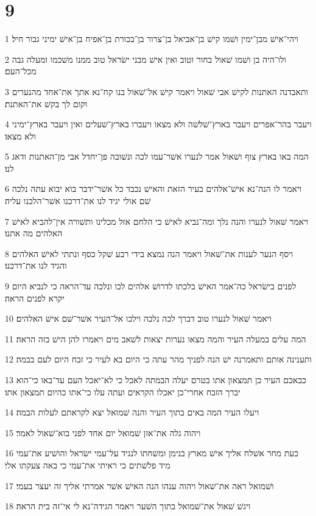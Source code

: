 \chapter{9}

\par 1 ויהי־אישׁ מבן־ימין ושׁמו קישׁ בן־אביאל בן־צרור בן־בכורת בן־אפיח בן־אישׁ ימיני גבור חיל׃
\par 2 ולו־היה בן ושׁמו שׁאול בחור וטוב ואין אישׁ מבני ישׂראל טוב ממנו משׁכמו ומעלה גבה מכל־העם׃
\par 3 ותאבדנה האתנות לקישׁ אבי שׁאול ויאמר קישׁ אל־שׁאול בנו קח־נא אתך את־אחד מהנערים וקום לך בקשׁ את־האתנת׃
\par 4 ויעבר בהר־אפרים ויעבר בארץ־שׁלשׁה ולא מצאו ויעברו בארץ־שׁעלים ואין ויעבר בארץ־ימיני ולא מצאו׃
\par 5 המה באו בארץ צוף ושׁאול אמר לנערו אשׁר־עמו לכה ונשׁובה פן־יחדל אבי מן־האתנות ודאג לנו׃
\par 6 ויאמר לו הנה־נא אישׁ־אלהים בעיר הזאת והאישׁ נכבד כל אשׁר־ידבר בוא יבוא עתה נלכה שׁם אולי יגיד לנו את־דרכנו אשׁר־הלכנו עליה׃
\par 7 ויאמר שׁאול לנערו והנה נלך ומה־נביא לאישׁ כי הלחם אזל מכלינו ותשׁורה אין־להביא לאישׁ האלהים מה אתנו׃
\par 8 ויסף הנער לענות את־שׁאול ויאמר הנה נמצא בידי רבע שׁקל כסף ונתתי לאישׁ האלהים והגיד לנו את־דרכנו׃
\par 9 לפנים בישׂראל כה־אמר האישׁ בלכתו לדרושׁ אלהים לכו ונלכה עד־הראה כי לנביא היום יקרא לפנים הראה׃
\par 10 ויאמר שׁאול לנערו טוב דברך לכה נלכה וילכו אל־העיר אשׁר־שׁם אישׁ האלהים׃
\par 11 המה עלים במעלה העיר והמה מצאו נערות יצאות לשׁאב מים ויאמרו להן הישׁ בזה הראה׃
\par 12 ותענינה אותם ותאמרנה ישׁ הנה לפניך מהר עתה כי היום בא לעיר כי זבח היום לעם בבמה׃
\par 13 כבאכם העיר כן תמצאון אתו בטרם יעלה הבמתה לאכל כי לא־יאכל העם עד־באו כי־הוא יברך הזבח אחרי־כן יאכלו הקראים ועתה עלו כי־אתו כהיום תמצאון אתו׃
\par 14 ויעלו העיר המה באים בתוך העיר והנה שׁמואל יצא לקראתם לעלות הבמה׃
\par 15 ויהוה גלה את־אזן שׁמואל יום אחד לפני בוא־שׁאול לאמר׃
\par 16 כעת מחר אשׁלח אליך אישׁ מארץ בנימן ומשׁחתו לנגיד על־עמי ישׂראל והושׁיע את־עמי מיד פלשׁתים כי ראיתי את־עמי כי באה צעקתו אלי׃
\par 17 ושׁמואל ראה את־שׁאול ויהוה ענהו הנה האישׁ אשׁר אמרתי אליך זה יעצר בעמי׃
\par 18 ויגשׁ שׁאול את־שׁמואל בתוך השׁער ויאמר הגידה־נא לי אי־זה בית הראה׃
